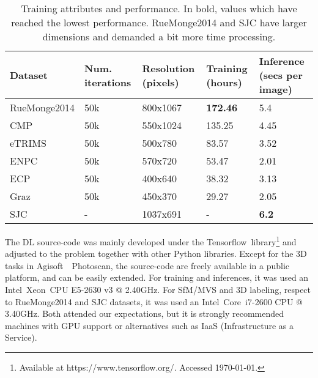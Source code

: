 \begin{table}[!htp]
    \renewcommand{\arraystretch}{1.4}
    \caption{Training attributes and performance. In bold, values which have reached the lowest performance. RueMonge2014 and SJC have larger dimensions and demanded a bit more time processing.}
    \scriptsize \centering
    \begin{tabular}{L{2.5cm}C{2.1cm}C{2.5cm}C{2.8cm}C{2.8cm}}
        \toprule
        \textbf{Dataset} & \textbf{Num. iterations} & \textbf{Resolution (pixels)} & \textbf{Training (hours)} & \textbf{Inference (secs per image)} \\ 
        \toprule
        RueMonge2014 & 50k & 800x1067 & \textbf{172.46} & 5.4\\      
        CMP & 50k & 550x1024 & 135.25 & 4.45 \\
        eTRIMS & 50k & 500x780 & 83.57 & 3.52 \\
        ENPC & 50k & 570x720 & 53.47 & 2.01 \\
        ECP & 50k & 400x640 & 38.32 & 3.13 \\      
        Graz & 50k & 450x370 & 29.27 & 2.05 \\ 
        SJC & - & 1037x691 & - & \textbf{6.2} \\ 
        \bottomrule
    \end{tabular}    
    \label{dataset-params}
\end{table}

The DL source-code was mainly developed under the Tensorflow\texttrademark~library\footnote{Available at https://www.tensorflow.org/. Accessed \today.} and adjusted to the problem together with other Python libraries. Except for the 3D tasks in Agisoft\textregistered~~Photoscan\texttrademark, the source-code are freely available in a public platform, and can be easily extended. For training and inferences, it was used an Intel\textregistered~Xeon\textregistered~CPU E5-2630 v3 @ 2.40GHz. For SfM/MVS and 3D labeling, respect to RueMonge2014 and SJC datasets, it was used an Intel\textregistered~Core\texttrademark~i7-2600 CPU @ 3.40GHz. Both attended our expectations, but it is strongly recommended machines with GPU support or alternatives such as IaaS (Infrastructure as a Service).

